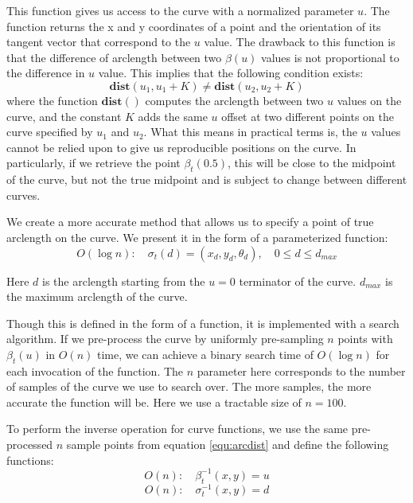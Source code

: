 This function gives us access to the curve with a normalized parameter $u$.  The function returns the x and y coordinates of a point and the orientation of its tangent vector that correspond to the $u$ value.  The drawback to this function is that the difference of arclength between two $\beta(u)$ values is not proportional to the difference in $u$ value.  This implies that the following condition exists:
\begin{equation}
\mathbf{dist}(u_1, u_1 + K) \neq \mathbf{dist}(u_2, u_2 + K)  
\end{equation}
where the function $\mathbf{dist}()$ computes the arclength between two $u$ values on the curve, and the constant $K$ adds the same $u$ offset at two different points on the curve specified by $u_1$ and $u_2$.  What this means in practical terms is, the $u$ values cannot be relied upon to give us reproducible positions on the curve.  In particularly, if we retrieve the point $\beta_t(0.5)$, this will be close to the midpoint of the curve, but not the true midpoint and is subject to change between different curves.

We create a more accurate method that allows us to specify a point of true arclength on the curve.  We present it in the form of a parameterized function:
\begin{equation}
\label{equ:arcdist}
O(\log n): \quad \sigma_t(d) = ( x_d, y_d, \theta_d ),  \quad 0 \leq d \leq d_{max}
\end{equation}

Here $d$ is the arclength starting from the $u = 0$ terminator of the curve.  $d_{max}$ is the maximum arclength of the curve.

Though this is defined in the form of a function, it is implemented with a search algorithm.  If we pre-process the curve by uniformly pre-sampling $n$ points with $\beta_t(u)$ in $O(n)$ time, we can achieve a binary search time of $O(\log n)$ for each invocation of the function.   The $n$ parameter here corresponds to the number of samples of the curve we use to search over.  The more samples, the more accurate the function will be.   Here we use a tractable size of $n = 100$.

To perform the inverse operation for curve functions, we use the same pre-processed $n$ sample points from equation \ref{equ:arcdist} and define the following functions:
\begin{equation}
O(n): \quad \beta^{-1}_t(x, y) = u
\end{equation}
\begin{equation}
O(n): \quad \sigma^{-1}_t(x, y) = d
\end{equation}

